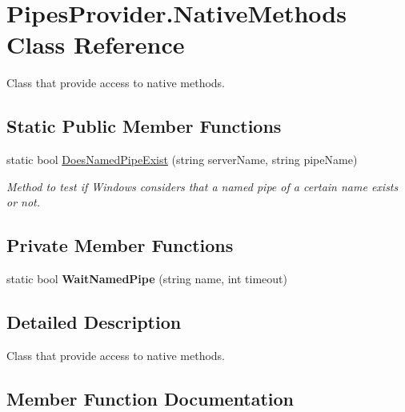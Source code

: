 \hypertarget{class_pipes_provider_1_1_native_methods}{}\section{Pipes\+Provider.\+Native\+Methods Class Reference}
\label{class_pipes_provider_1_1_native_methods}


Class that provide access to native methods.  


\subsection*{Static Public Member Functions}
\begin{DoxyCompactItemize}
\item 
static bool \mbox{\hyperlink{class_pipes_provider_1_1_native_methods_a9455b60ac124b9a4e3170f1fbbd3c839}{Does\+Named\+Pipe\+Exist}} (string server\+Name, string pipe\+Name)
\begin{DoxyCompactList}\small\item\em Method to test if Windows considers that a named pipe of a certain name exists or not. \end{DoxyCompactList}\end{DoxyCompactItemize}
\subsection*{Private Member Functions}
\begin{DoxyCompactItemize}
\item 
\mbox{\label{class_pipes_provider_1_1_native_methods_a1a2952e32dd0e63f65ffd4103eee0942}} 
static bool {\bfseries Wait\+Named\+Pipe} (string name, int timeout)
\end{DoxyCompactItemize}


\subsection{Detailed Description}
Class that provide access to native methods. 



\subsection{Member Function Documentation}
\mbox{\label{class_pipes_provider_1_1_native_methods_a9455b60ac124b9a4e3170f1fbbd3c839}} 
